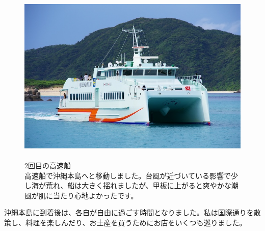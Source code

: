 \documentclass[../main]{subfiles}
\begin{document}
\begin{figure}[H]
  \begin{minipage}[b]{0.48\columnwidth}
    \centering
    \includegraphics[width=\columnwidth]{figure/queen_zamami.jpg}
  \end{minipage}
  \hspace{0.04\columnwidth} %
  \begin{minipage}[b]{0.48\columnwidth}
    \caption{\\
    2回目の高速船\\
    高速船で沖縄本島へと移動しました。台風が近づいている影響で少し海が荒れ、船は大きく揺れましたが、甲板に上がると爽やかな潮風が肌に当たり心地よかったです。
    }
  \end{minipage}
\end{figure}
沖縄本島に到着後は、各自が自由に過ごす時間となりました。私は国際通りを散策し、料理を楽しんだり、お土産を買うためにお店をいくつも巡りました。
\end{document}
